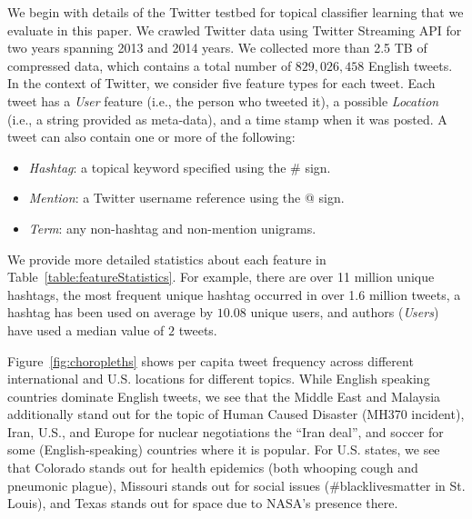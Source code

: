 
We begin with details of the Twitter testbed for topical classifier learning
that we evaluate in this paper.  We crawled Twitter data using Twitter
Streaming API for two years spanning 2013 and 2014 years.
We collected more than 2.5 TB of compressed data, which contains a total number 
of $829,026,458$ English tweets. In the context 
of Twitter, we consider five feature types for each tweet.  Each
tweet has a \textit{User} feature (i.e., the person who tweeted it), a
possible \textit{Location} (i.e., a string provided as meta-data), and
a time stamp when it was posted.  A tweet can also contain one or more
of the following:
\begin{itemize}
\item \textit{Hashtag}: a topical keyword specified using the \# sign.
\item \textit{Mention}: a Twitter username reference using the @ sign. %
\item \textit{Term}:    any non-hashtag and non-mention unigrams. %
\end{itemize}
We provide more detailed statistics about each feature in
Table~\ref{table:featureStatistics}.  For example, there are
over 11 million unique hashtags, the most frequent unique hashtag
occurred in over 1.6 million tweets,
a hashtag has been used on average by $10.08$ unique users, and 
authors (\textit{Users}) have used a median value of $2$
tweets. %

Figure~\ref{fig:choropleths} shows per capita tweet frequency across
different international and U.S. locations for different topics.
While English speaking countries dominate English tweets, we see that
the Middle East and Malaysia additionally stand out for the topic of
Human Caused Disaster (MH370 incident), Iran, U.S., and Europe for nuclear
negotiations the ``Iran deal'', and soccer for some (English-speaking)
countries where it is popular.  For U.S. states, we see that Colorado
stands out for health epidemics (both whooping cough and pneumonic
plague), Missouri stands out for social issues (\#blacklivesmatter in
St. Louis), and Texas stands out for space due to NASA's presence
there.
